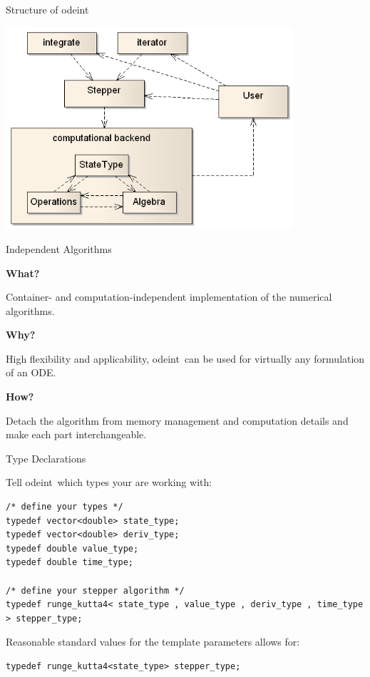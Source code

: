 \documentclass{beamer}
\newcommand{\heading}[1]{\centerline{\Large #1} \vspace{0.5em}}
\newcommand{\odeint}[0]{odeint}
\begin{document}
\begin{frame}
 \heading{Structure of \odeint}
 
 \vspace{2ex}
 \centerline{\includegraphics[draft=false,width=0.8\textwidth]{odeint_modularization.png}}

\end{frame}


\begin{frame}
\heading{Independent Algorithms}

\vspace{1em}
\textbf{What?}

Container- and computation-independent implementation of the numerical algorithms.  

\vspace{2em}
\textbf{Why?}

High flexibility and applicability, \odeint\ can be used for virtually any formulation of an ODE.

\vspace{2em}
\textbf{How?}

Detach the algorithm from memory management and computation details and make each part interchangeable.

\end{frame}


\begin{frame}[fragile]
 \heading{Type Declarations}

Tell \odeint\ which types your are working with:

\begin{lstlisting}
/* define your types */
typedef vector<double> state_type;
typedef vector<double> deriv_type;
typedef double value_type;
typedef double time_type;

/* define your stepper algorithm */
typedef runge_kutta4< state_type , value_type , deriv_type , time_type > stepper_type;
\end{lstlisting}

Reasonable standard values for the template parameters allows for:

\begin{lstlisting}
typedef runge_kutta4<state_type> stepper_type;
\end{lstlisting}

\end{frame}
\end{document}
